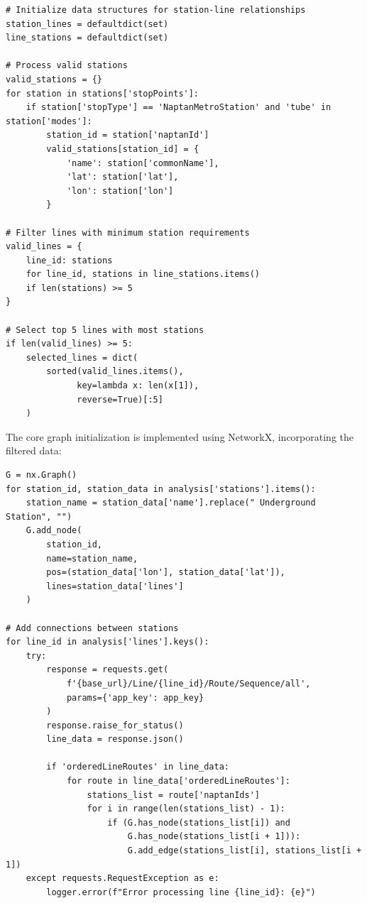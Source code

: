 \documentclass{article}
\begin{document}
\begin{lstlisting}[style=PythonStyle, caption={Data Processing and Filtering}]
# Initialize data structures for station-line relationships
station_lines = defaultdict(set)
line_stations = defaultdict(set)

# Process valid stations
valid_stations = {}
for station in stations['stopPoints']:
    if station['stopType'] == 'NaptanMetroStation' and 'tube' in station['modes']:
        station_id = station['naptanId']
        valid_stations[station_id] = {
            'name': station['commonName'],
            'lat': station['lat'],
            'lon': station['lon']
        }

# Filter lines with minimum station requirements
valid_lines = {
    line_id: stations
    for line_id, stations in line_stations.items()
    if len(stations) >= 5
}

# Select top 5 lines with most stations
if len(valid_lines) >= 5:
    selected_lines = dict(
        sorted(valid_lines.items(),
              key=lambda x: len(x[1]),
              reverse=True)[:5]
    )
\end{lstlisting}

The core graph initialization is implemented using NetworkX, incorporating the filtered data:

\begin{lstlisting}[style=PythonStyle, caption={NetworkX Graph Initialization}]
G = nx.Graph()
for station_id, station_data in analysis['stations'].items():
    station_name = station_data['name'].replace(" Underground Station", "")
    G.add_node(
        station_id,
        name=station_name,
        pos=(station_data['lon'], station_data['lat']),
        lines=station_data['lines']
    )

# Add connections between stations
for line_id in analysis['lines'].keys():
    try:
        response = requests.get(
            f'{base_url}/Line/{line_id}/Route/Sequence/all',
            params={'app_key': app_key}
        )
        response.raise_for_status()
        line_data = response.json()

        if 'orderedLineRoutes' in line_data:
            for route in line_data['orderedLineRoutes']:
                stations_list = route['naptanIds']
                for i in range(len(stations_list) - 1):
                    if (G.has_node(stations_list[i]) and
                        G.has_node(stations_list[i + 1])):
                        G.add_edge(stations_list[i], stations_list[i + 1])
    except requests.RequestException as e:
        logger.error(f"Error processing line {line_id}: {e}")
\end{lstlisting}
\end{document}
